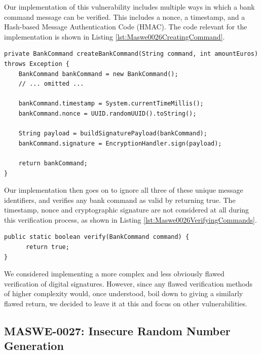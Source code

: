 Our implementation of this vulnerability includes multiple ways in which a bank command message can be verified. This includes a nonce, a timestamp, and a Hash-based Message Authentication Code (HMAC). The code relevant for the implementation is shown in Listing \ref{lst:Maswe0026CreatingCommand}.

\begin{lstlisting}[style=JavaStyle, float=tbh, captionpos=b, caption={Creation of a bank command including a timestamp, a nonce and a cryptographic signature}, label={lst:Maswe0026CreatingCommand}]
private BankCommand createBankCommand(String command, int amountEuros) throws Exception {
    BankCommand bankCommand = new BankCommand();
    // ... omitted ...

    bankCommand.timestamp = System.currentTimeMillis();
    bankCommand.nonce = UUID.randomUUID().toString();

    String payload = buildSignaturePayload(bankCommand);
    bankCommand.signature = EncryptionHandler.sign(payload);

    return bankCommand;
}
\end{lstlisting}

Our implementation then goes on to ignore all three of these unique message identifiers, and verifies any bank command as valid by returning true. The timestamp, nonce and cryptographic signature are not considered at all during this verification process, as shown in Listing \ref{lst:Maswe0026VerifyingCommands}.

\begin{lstlisting}[style=JavaStyle, float=tbh, captionpos=b, caption={Verifying any passed banking command as true, regardless of its timestamp, nonce and signature}, label={lst:Maswe0026VerifyingCommands}]
public static boolean verify(BankCommand command) {
      return true;
}
\end{lstlisting}

We considered implementing a more complex and less obviously flawed verification of digital signatures. However, since any flawed verification methods of higher complexity would, once understood, boil down to giving a similarly flawed return, we decided to leave it at this and focus on other vulnerabilities.

\subsection{MASWE-0027: Insecure Random Number Generation}
\label{subsec:maswe-0027}

